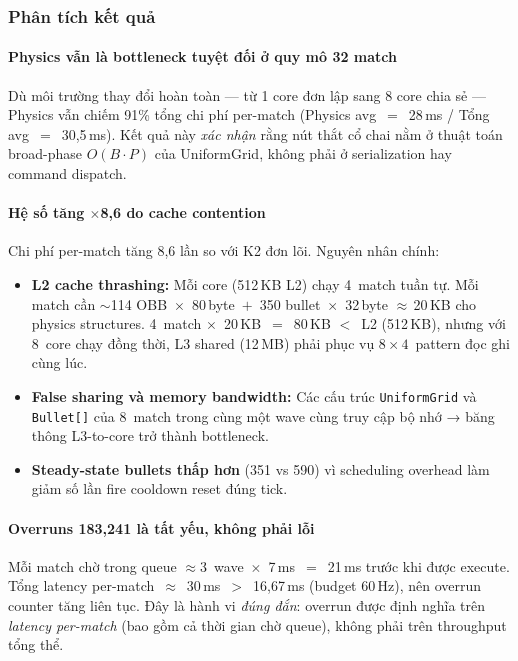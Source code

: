 \documentclass[12pt,a4paper]{report}
\begin{document}
\subsubsection*{Phân tích kết quả}

\paragraph{Physics vẫn là bottleneck tuyệt đối ở quy mô 32 match}
Dù môi trường thay đổi hoàn toàn --- từ 1 core đơn lập sang 8 core chia sẻ ---
Physics vẫn chiếm 91\% tổng chi phí per-match (Physics avg~$=$~28\,ms /
Tổng avg~$=$~30{,}5\,ms). Kết quả này \emph{xác nhận} rằng nút thắt cổ chai
nằm ở thuật toán broad-phase $O(B{\cdot}P)$ của UniformGrid, không phải ở
serialization hay command dispatch.

\paragraph{Hệ số tăng $\times$8{,}6 do cache contention}
Chi phí per-match tăng 8{,}6 lần so với K2 đơn lõi. Nguyên nhân chính:
\begin{itemize}
  \item \textbf{L2 cache thrashing:} Mỗi core (512\,KB L2) chạy 4~match tuần
        tự. Mỗi match cần $\sim$114 OBB~$\times$~80\,byte~$+$~350 bullet~$\times$~32\,byte
        $\approx$\,20\,KB cho physics structures. 4~match $\times$~20\,KB~$=$~80\,KB
        $<$~L2 (512\,KB), nhưng với 8~core chạy đồng thời, L3 shared (12\,MB)
        phải phục vụ $8\times4$~pattern đọc ghi cùng lúc.
  \item \textbf{False sharing và memory bandwidth:} Các cấu trúc
        \texttt{UniformGrid} và \texttt{Bullet[]} của 8~match trong cùng một
        wave cùng truy cập bộ nhớ → băng thông L3-to-core trở thành bottleneck.
  \item \textbf{Steady-state bullets thấp hơn} (351 vs 590) vì scheduling
        overhead làm giảm số lần fire cooldown reset đúng tick.
\end{itemize}

\paragraph{Overruns 183{,}241 là tất yếu, không phải lỗi}
Mỗi match chờ trong queue $\approx$3~wave~$\times$~7\,ms~$=$~21\,ms trước khi
được execute. Tổng latency per-match~$\approx$~30\,ms~$>$~16{,}67\,ms (budget
60\,Hz), nên overrun counter tăng liên tục. Đây là hành vi \emph{đúng đắn}:
overrun được định nghĩa trên \emph{latency per-match} (bao gồm cả thời gian
chờ queue), không phải trên throughput tổng thể.
\end{document}
